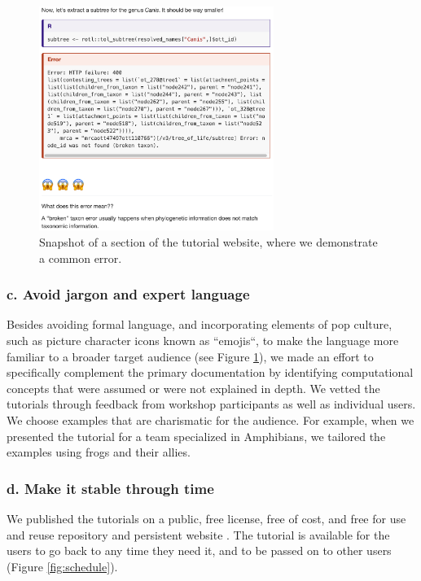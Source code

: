\documentclass[12pt]{article}
\begin{document}
\begin{figure}
\begin{center}
\includegraphics[width=3in]{fig-error.png}
\end{center}
\caption{Snapshot of a section of the tutorial website, where we demonstrate a common error. \label{fig:error}}
\end{figure}

\subsubsection*{c. Avoid jargon and expert language}

Besides avoiding formal language, and incorporating elements of pop culture, such as picture
character icons known as ``emojis``, to make the language more familiar to a
broader target audience (see Figure \ref{fig:error}), we made an effort to specifically
complement the primary documentation by identifying
computational concepts that were assumed or were not explained in depth.
We vetted the tutorials through feedback from workshop participants as well as individual users.
We choose examples that are charismatic for the audience.
For example, when we presented the tutorial for a team specialized in Amphibians,
we tailored the examples using frogs and their allies.


\subsubsection*{d. Make it stable through time}

We published the tutorials on a public, free license, free of cost, and free for
use and reuse repository and persistent website \citep{RopentreeTutorials, RopentreeTutorialsWebsite}.
The tutorial is available for the users to go back to any time they need it,
and to be passed on to other users (Figure \ref{fig:schedule}).
\end{document}
